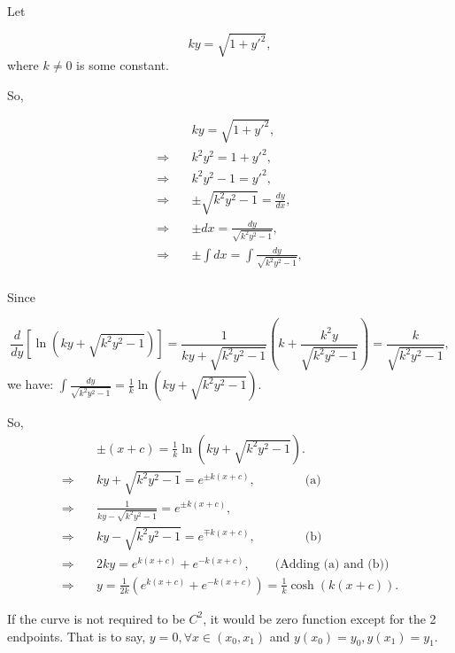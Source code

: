 \documentclass[
  course = {{16-811 Math Fundamentals for Robotics}},
  quartile = {{1}},
  assignment = 5,
  name = {{Kangle Deng}},
  email = {{kangled@andrew.cmu.edu}},
  firstexercise = 1
]{aga-homework}
\begin{document}
Let 

\begin{equation*}
    ky = \sqrt{1+y'^2},
\end{equation*}
where $k \ne 0$ is some constant.

So,

\begin{equation*}
    \begin{aligned}
     & ky = \sqrt{1+y'^2}, \\
     \Rightarrow \quad & k^2y^2 = 1 + y'^2, \\
     \Rightarrow \quad & k^2y^2 - 1 = y'^2, \\
     \Rightarrow \quad & \pm \sqrt{k^2y^2 - 1} = \frac{dy}{dx}, \\
     \Rightarrow \quad & \pm dx = \frac{dy}{\sqrt{k^2y^2 - 1}}, \\
     \Rightarrow \quad & \pm \int dx = \int \frac{dy}{\sqrt{k^2y^2 - 1}}, \\
    \end{aligned}
\end{equation*}

Since

\begin{equation*}
    \frac{d}{dy}[\ln(ky+\sqrt{k^2y^2-1})] = \frac{1}{ky+\sqrt{k^2y^2-1}}(k+\frac{k^2y}{\sqrt{k^2y^2-1}}) = \frac{k}{\sqrt{k^2y^2-1}},
\end{equation*}
we have: $\int \frac{dy}{\sqrt{k^2y^2 - 1}} = \frac{1}{k}\ln(ky+\sqrt{k^2y^2-1})$.

So,
\begin{equation*}
    \begin{aligned}
     & \pm (x + c) = \frac{1}{k}\ln(ky+\sqrt{k^2y^2-1}). \\
     \Rightarrow \quad & ky+\sqrt{k^2y^2-1} = e^{\pm k(x+c)}, \qquad\qquad \text{(a)}\\
     \Rightarrow \quad & \frac{1}{ky-\sqrt{k^2y^2-1}} = e^{\pm k(x+c)}, \\
     \Rightarrow \quad & ky-\sqrt{k^2y^2-1} = e^{\mp k(x+c)}, \qquad\qquad \text{(b)}\\
     \Rightarrow \quad & 2ky = e^{k(x+c)} + e^{-k(x+c)}, \qquad \text{(Adding (a) and (b))} \\
     \Rightarrow \quad & y = \frac{1}{2k}(e^{k(x+c)} + e^{-k(x+c)}) = \frac{1}{k}\cosh(k(x+c)).
    \end{aligned}
\end{equation*}

If the curve is not required to be $C^2$, it would be zero function except for the 2 endpoints. That is to say, $y = 0, \forall x \in (x_0,x_1)$ and $y(x_0) = y_0, y(x_1) = y_1$.
\end{document}

